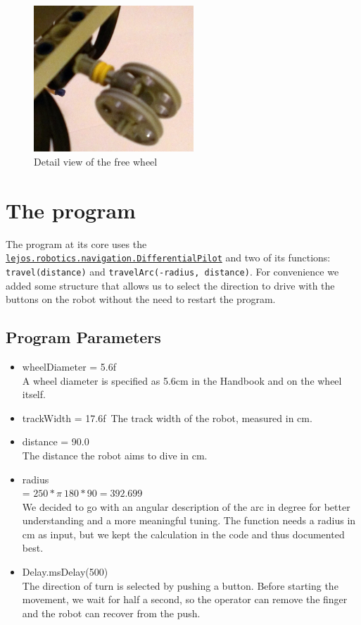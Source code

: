 \documentclass{scrartcl}
\begin{document}
\begin{figure}
 \center
 \includegraphics[width= 6cm]{img/steering_wheel.jpg}
 \caption{Detail view of the free wheel}
 \label{fig:free_wheel}
\end{figure}


\section{The program}

The program at its core uses the \texttt{
\href{http://www.lejos.org/nxt/nxj/api/lejos/robotics/navigation/DifferentialPilot.html}{lejos.robotics.navigation.DifferentialPilot}} and two of its functions: \texttt{travel(distance)} and \texttt{travelArc(-radius, distance)}. For convenience we added some structure that allows us to select the direction to drive with the buttons on the robot without the need to restart the program.

\subsection{Program Parameters}
\begin{itemize}
\item wheelDiameter = 5.6f\\
A wheel diameter is specified as 5.6cm in the Handbook and on the wheel itself.

\item trackWidth = 17.6f\
The track width of the robot, measured in cm.

\item distance = 90.0\\
The distance the robot aims to dive in cm.

\item radius\\
 = $250 * \pi \ 180 * 90 = 392.699$\\
 We decided to go with an angular description of the arc in degree for better understanding and a more meaningful tuning. The function needs a radius in cm as input, but we kept the calculation in the code and thus documented best.

\item Delay.msDelay(500)\\
The direction of turn is selected by pushing a button. Before starting the movement, we wait for half a second, so the operator can remove the finger and the robot can recover from the push.
\end{itemize}
\end{document}
